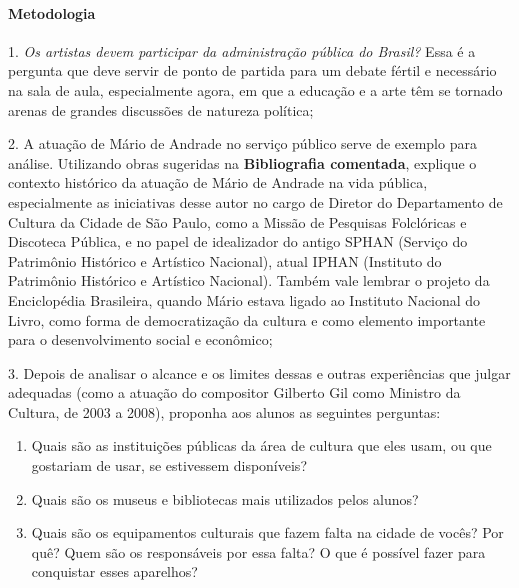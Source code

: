 \documentclass[11pt]{extarticle}
\begin{document}
\paragraph{Metodologia}

1. \textit{Os artistas devem participar da administração pública do Brasil?} Essa
é a pergunta que deve servir de ponto de partida para um debate fértil e
necessário na sala de aula, especialmente agora, em que a educação e a
arte têm se tornado arenas de grandes discussões de natureza política;

\vspace{3mm}

2. A atuação de Mário de Andrade no serviço público serve de exemplo
para análise. Utilizando obras sugeridas na \textbf{Bibliografia
comentada}, explique o contexto histórico da atuação de Mário de Andrade
na vida pública, especialmente as iniciativas desse autor no cargo de
Diretor do Departamento de Cultura da Cidade de São Paulo, como a Missão
de Pesquisas Folclóricas e Discoteca Pública, e no papel de idealizador
do antigo SPHAN (Serviço do Patrimônio Histórico e Artístico Nacional),
atual IPHAN (Instituto do Patrimônio Histórico e Artístico Nacional).
Também vale lembrar o projeto da Enciclopédia Brasileira, quando Mário
estava ligado ao Instituto Nacional do Livro, como forma de
democratização da cultura e como elemento importante para o
desenvolvimento social e econômico;

\vspace{3mm}

3. Depois de analisar o alcance e os limites dessas e outras
experiências que julgar adequadas (como a atuação do compositor Gilberto
Gil como Ministro da Cultura, de 2003 a 2008), proponha aos alunos as
seguintes perguntas:

\begin{enumerate}

\item Quais são as instituições públicas da área de cultura que eles usam,
ou que gostariam de usar, se estivessem disponíveis?

\item Quais são os museus e bibliotecas mais utilizados pelos alunos?

\item Quais são os equipamentos culturais que fazem falta na cidade de
vocês? Por quê? Quem são os responsáveis por essa falta? O que é
possível fazer para conquistar esses aparelhos?

\end{enumerate} 
\end{document}
